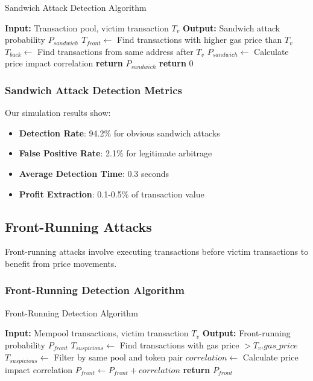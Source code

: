 \documentclass[11pt,a4paper]{article}
\begin{document}
\begin{algorithm}
\caption{Sandwich Attack Detection Algorithm}
\begin{algorithmic}[1]
\STATE \textbf{Input:} Transaction pool, victim transaction $T_v$
\STATE \textbf{Output:} Sandwich attack probability $P_{sandwich}$
\STATE
\STATE $T_{front} \leftarrow$ Find transactions with higher gas price than $T_v$
\STATE $T_{back} \leftarrow$ Find transactions from same address after $T_v$
\STATE
{}
    \STATE $P_{sandwich} \leftarrow$ Calculate price impact correlation
    \STATE \textbf{return} $P_{sandwich}$
\ELSE
    \STATE \textbf{return} $0$
\ENDIF
\end{algorithmic}
\end{algorithm}

\subsubsection{Sandwich Attack Detection Metrics}

Our simulation results show:
\begin{itemize}
\item \textbf{Detection Rate}: 94.2\% for obvious sandwich attacks
\item \textbf{False Positive Rate}: 2.1\% for legitimate arbitrage
\item \textbf{Average Detection Time}: 0.3 seconds
\item \textbf{Profit Extraction}: 0.1-0.5\% of transaction value
\end{itemize}

\subsection{Front-Running Attacks}

Front-running attacks involve executing transactions before victim transactions to benefit from price movements.

\subsubsection{Front-Running Detection Algorithm}

\begin{algorithm}
\caption{Front-Running Detection Algorithm}
\begin{algorithmic}[1]
\STATE \textbf{Input:} Mempool transactions, victim transaction $T_v$
\STATE \textbf{Output:} Front-running probability $P_{front}$
\STATE
\STATE $T_{suspicious} \leftarrow$ Find transactions with gas price $> T_v.gas\_price$
\STATE $T_{suspicious} \leftarrow$ Filter by same pool and token pair
\STATE
{}
    \STATE $correlation \leftarrow$ Calculate price impact correlation
        \STATE $P_{front} \leftarrow P_{front} + correlation$
    \ENDIF
\ENDFOR
\STATE \textbf{return} $P_{front}$
\end{algorithmic}
\end{algorithm}
\end{document}
